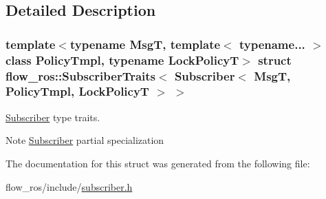 \subsection{Detailed Description}
\subsubsection*{template$<$typename MsgT, template$<$ typename... $>$ class Policy\+Tmpl, typename Lock\+PolicyT$>$\newline
struct flow\+\_\+ros\+::\+Subscriber\+Traits$<$ Subscriber$<$ Msg\+T, Policy\+Tmpl, Lock\+Policy\+T $>$ $>$}

\hyperlink{classflow__ros_1_1_subscriber}{Subscriber} type traits. 

\begin{DoxyNote}{Note}
\hyperlink{classflow__ros_1_1_subscriber}{Subscriber} partial specialization 
\end{DoxyNote}


The documentation for this struct was generated from the following file\+:\begin{DoxyCompactItemize}
\item 
flow\+\_\+ros/include/\hyperlink{subscriber_8h}{subscriber.\+h}\end{DoxyCompactItemize}
